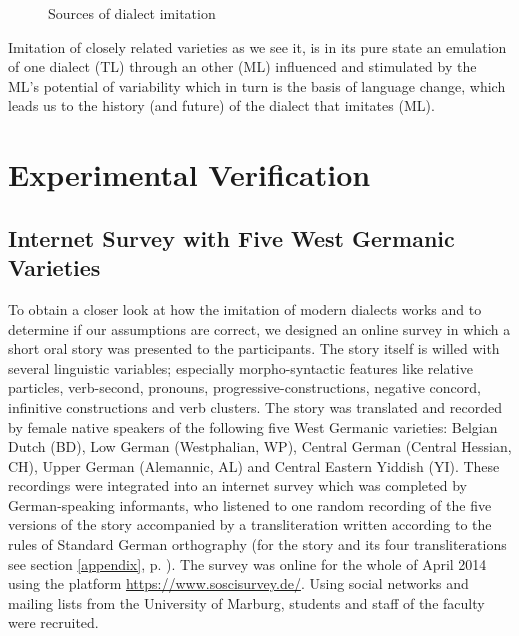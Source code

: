 \documentclass[output=paper]{LSP/langsci}
\begin{document}
\begin{figure}[htbp]
 \begin{center}
              \caption{Sources of dialect imitation}\label{imitationalssubtraktiveFarbmischung}	
\end{center}
 \end{figure}
\FloatBarrier


Imitation of closely related varieties as we see it, is in its pure state an emulation of one dialect (TL) through an other (ML) influenced and stimulated by the ML's potential of variability which in turn is the basis of language change, which leads us to the history (and future) of the dialect that imitates (ML).

 \section{Experimental Verification}\label{experiment}
 
 
 \subsection{Internet Survey with Five West Germanic Varieties }\label{online}

To obtain a closer look at how the imitation of modern dialects works and to determine if our assumptions are correct, we designed an online survey in which a short oral story was presented to the participants. The story itself is willed with several linguistic variables; especially morpho-syntactic features like relative particles, verb-second, pronouns, progressive-constructions, negative concord, infinitive constructions and verb clusters. The story was translated and recorded by female native speakers of the following five West Germanic varieties: Belgian Dutch (BD), Low German (Westphalian, WP), Central German (Central Hessian, CH), Upper German (Alemannic, AL) and Central Eastern Yiddish (YI). These recordings were integrated into an internet survey which was completed by German-speaking informants, who listened to one random recording of the five versions of the story accompanied by a transliteration written according to the rules of Standard German orthography (for the story and its four transliterations see section \ref{appendix}, p. \pageref{appendix}). The survey was online for the whole of April 2014 using the platform \url{https://www.soscisurvey.de/}. Using social networks and mailing lists from the University of Marburg, students and staff of the faculty were recruited.
\end{document}
